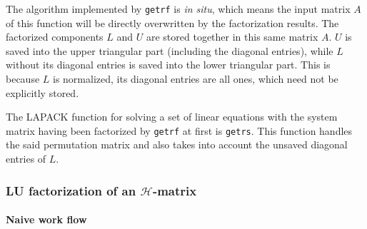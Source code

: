 \documentclass[11pt, a4paper]{book}
\begin{document}
The algorithm implemented by \texttt{getrf} is \textit{in situ}, which means the input
matrix $A$ of this function will be directly overwritten by the factorization results. The
factorized components $L$ and $U$ are stored together in this same matrix $A$. $U$ is
saved into the upper triangular part (including the diagonal entries), while $L$ without
its diagonal entries is saved into the lower triangular part. This is because $L$ is
normalized, its diagonal entries are all ones, which need not be explicitly stored.

The LAPACK function for solving a set of linear equations with the system matrix having
been factorized by \texttt{getrf} at first is \texttt{getrs}. This function handles the said
permutation matrix and also takes into account the unsaved diagonal entries of $L$.

\subsubsection{LU factorization of an $\mathcal{H}$-matrix}
\label{sec:lu-hmat}

\paragraph{Naive work flow}
\end{document}
